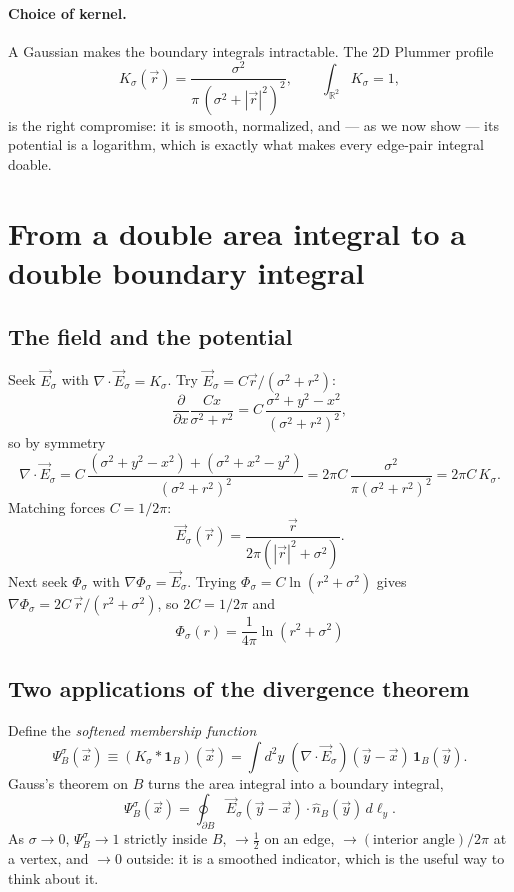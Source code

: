 \documentclass[11pt]{article}
\numberwithin{equation}{section}
\newcommand{\vv}[1]{\vec{#1}}
\newcommand{\half}{\tfrac{1}{2}}
\begin{document}
\paragraph{Choice of kernel.} A Gaussian makes the boundary integrals intractable. The 2D Plummer
profile
\begin{equation}\label{eq:K}
  K_\sigma(\vv r)=\frac{\sigma^2}{\pi\,(\sigma^2+|\vv r|^2)^2},\qquad \int_{\mathbb R^2}K_\sigma=1,
\end{equation}
is the right compromise: it is smooth, normalized, and --- as we now show --- its potential is a
logarithm, which is exactly what makes every edge-pair integral doable.

\section{From a double area integral to a double boundary integral}\label{sec:boundary}

\subsection{The field and the potential}
Seek $\vv E_\sigma$ with $\nabla\!\cdot\!\vv E_\sigma=K_\sigma$. Try $\vv E_\sigma=C\vv r/(\sigma^2+r^2)$:
\[
  \frac{\partial}{\partial x}\frac{Cx}{\sigma^2+r^2}=C\,\frac{\sigma^2+y^2-x^2}{(\sigma^2+r^2)^2},
\]
so by symmetry
\[
  \nabla\!\cdot\!\vv E_\sigma=C\,\frac{(\sigma^2+y^2-x^2)+(\sigma^2+x^2-y^2)}{(\sigma^2+r^2)^2}
  =2\pi C\,\frac{\sigma^2}{\pi(\sigma^2+r^2)^2}=2\pi C\,K_\sigma .
\]
Matching forces $C=1/2\pi$:
\begin{equation}\label{eq:E}
  \vv E_\sigma(\vv r)=\frac{\vv r}{2\pi(|\vv r|^2+\sigma^2)} .
\end{equation}
Next seek $\Phi_\sigma$ with $\nabla\Phi_\sigma=\vv E_\sigma$. Trying $\Phi_\sigma=C\ln(r^2+\sigma^2)$
gives $\nabla\Phi_\sigma=2C\,\vv r/(r^2+\sigma^2)$, so $2C=1/2\pi$ and
\begin{equation}\label{eq:Phi}
  \boxed{\;\Phi_\sigma(r)=\frac{1}{4\pi}\ln(r^2+\sigma^2)\;}
\end{equation}

\subsection{Two applications of the divergence theorem}
Define the \emph{softened membership function}
\begin{equation}\label{eq:Psidef}
  \Psi_B^\sigma(\vv x)\equiv(K_\sigma*\mathbf 1_B)(\vv x)
  =\int d^2y\;(\nabla\!\cdot\!\vv E_\sigma)(\vv y-\vv x)\,\mathbf 1_B(\vv y).
\end{equation}
Gauss's theorem on $B$ turns the area integral into a boundary integral,
\begin{equation}\label{eq:PsiGauss}
  \Psi_B^\sigma(\vv x)=\oint_{\partial B}\vv E_\sigma(\vv y-\vv x)\!\cdot\!\hat n_B(\vv y)\,d\ell_y .
\end{equation}
As $\sigma\to0$, $\Psi_B^\sigma\to1$ strictly inside $B$, $\to\half$ on an edge, $\to(\text{interior
angle})/2\pi$ at a vertex, and $\to0$ outside: it is a smoothed indicator, which is the useful way to
think about it.
\end{document}
